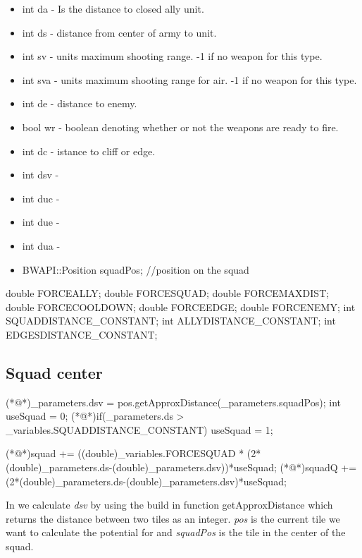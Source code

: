 	\begin{itemize}
		\item int da - Is the distance to closed ally unit.
		\item int ds - distance from center of army to unit.
		\item int sv - units maximum shooting range. -1 if no weapon for this type.
		\item int sva - units maximum shooting range for air. -1 if no weapon for this type.
		\item int de - distance to enemy.
		\item bool wr - boolean denoting whether or not the weapons are ready to fire.
		\item int dc - istance to cliff or edge.
		\item int dsv - 
		\item int duc - 
		\item int due - 
		\item int dua - 
		\item BWAPI::Position squadPos; //position on the squad
	\end{itemize}

		\begin{Sourcecode}[caption=Variables]
double FORCEALLY;
double FORCESQUAD;
double FORCEMAXDIST;
double FORCECOOLDOWN;
double FORCEEDGE;
double FORCENEMY;
int SQUADDISTANCE_CONSTANT;
int ALLYDISTANCE_CONSTANT;
int EDGESDISTANCE_CONSTANT;
\end{Sourcecode}
	 
	
	\subsection{Squad center}	
		\begin{Sourcecode}[caption=Squad center]
(*@\lnote@*)_parameters.dsv = pos.getApproxDistance(_parameters.squadPos);	
int useSquad = 0;
(*@\lnote@*)if(_parameters.ds > _variables.SQUADDISTANCE_CONSTANT)
	useSquad = 1;

(*@\lnote@*)squad += ((double)_variables.FORCESQUAD * (2*(double)_parameters.ds-(double)_parameters.dsv))*useSquad;
(*@\lnote@*)squadQ += (2*(double)_parameters.ds-(double)_parameters.dsv)*useSquad;
\end{Sourcecode}
		In  we calculate \textit{dsv} by using the build in function getApproxDistance which returns the distance between two tiles as an integer. \textit{pos} is the current tile we want to calculate the potential for and \textit{squadPos} is the tile in the center of the squad.
		
